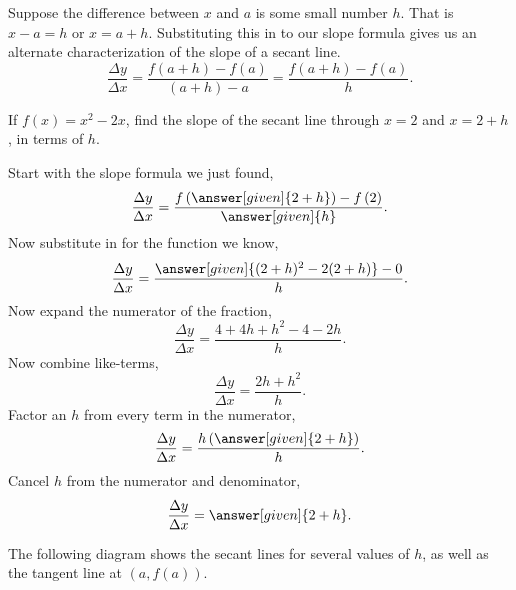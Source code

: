 \documentclass{ximera}
\begin{document}
Suppose the difference between $x$ and $a$ is some small number $h$.  That
is $x-a=h$ or $x=a+h$.  Substituting this in to our slope formula gives us
an alternate characterization of the slope of a secant line.
\[
\frac{\Delta y}{\Delta x} = \frac{f(a+h)-f(a)}{(a+h)-a} = \frac{f(a+h)-f(a)}{h}.
\]

\begin{example}
  If $f(x) = x^2-2x$, find the slope of the secant line through $x=2$ and $x=2+h$, in terms of $h$.
  \begin{explanation}
    Start with the slope formula we just found,
    \[
    \frac{\Delta y}{\Delta x} = \frac{f\left(\answer[given]{2+h}\right)-f\left(2\right)}{\answer[given]{h}}.
    \]
    Now substitute in for the function we know,
    \[
    \frac{\Delta y}{\Delta x} = \frac{\answer[given]{(2+h)^2-2(2+h)} -0}{h}.
    \]
    Now expand the numerator of the fraction,
    \[
    \frac{\Delta y}{\Delta x} = \frac{4+4h+h^2-4-2h }{h}.
    \]
    Now combine like-terms,
    \[
    \frac{\Delta y}{\Delta x} = \frac{2h+h^2}{h}.
    \]
    Factor an $h$ from every term in the numerator,
    \[
    \frac{\Delta y}{\Delta x} = \frac{h\left(\answer[given]{2+h}\right)}{h}.
    \]
    Cancel $h$ from the numerator and denominator,
    \[
    \frac{\Delta y}{\Delta x} = \answer[given]{2+h}. 
    \]
  \end{explanation}
\end{example}



The following diagram shows the secant lines for several values of
$h$, as well as the tangent line at $(a,f(a))$.
\end{document}
